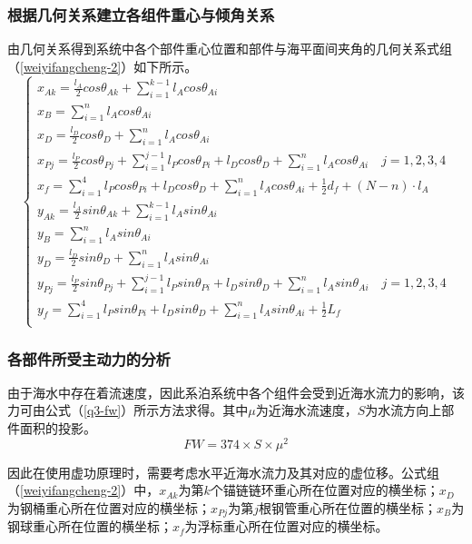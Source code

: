 \documentclass[withoutpreface,bwprint]{cumcmthesis} %
\begin{document}
\subsubsection{根据几何关系建立各组件重心与倾角关系}
\par 由几何关系得到系统中各个部件重心位置和部件与海平面间夹角的几何关系式组（\ref{weiyifangcheng-2}）如下所示。
\begin{equation}
	\label{weiyifangcheng-2}
	\left\{
	\begin{array}{lr}
		x_{Ak} = \frac{l_A}{2} cos \theta_{Ak} + \sum\limits_{i=1}^{k-1} l_A cos \theta_{Ai}\\
		x_B = \sum\limits_{i=1}^{n} l_A cos \theta_{Ai}\\
		x_D = \frac{l_D}{2} cos \theta_D + \sum\limits_{i=1}^{n} l_A cos \theta_{Ai}\\
		x_{Pj} = \frac{l_P}{2} cos \theta_{Pj} + \sum\limits_{i=1}^{j-1} l_P cos \theta_{Pi} + l_D cos \theta_D + \sum\limits_{i=1}^{n} l_A cos \theta_{Ai} \quad j = 1,2,3,4 \\
		x_f = \sum\limits_{i=1}^{4} l_P cos \theta_{Pi} + l_D cos \theta_D + \sum\limits_{i=1}^{n} l_A cos \theta_{Ai} + \frac{1}{2} d_f + (N - n) \cdot l_A\\
		y_{Ak} = \frac{l_A}{2} sin \theta_{Ak} + \sum\limits_{i=1}^{k-1} l_A sin \theta_{Ai}\\
		y_B = \sum\limits_{i=1}^{n} l_A sin \theta_{Ai}\\
		y_D = \frac{l_D}{2} sin \theta_D + \sum\limits_{i=1}^{n} l_A sin \theta_{Ai}\\
		y_{Pj} = \frac{l_P}{2} sin \theta_{Pj} + \sum\limits_{i=1}^{j-1} l_P sin \theta_{Pi} + l_D sin \theta_D + \sum\limits_{i=1}^{n} l_A sin \theta_{Ai} \quad j = 1,2,3,4 \\
		y_f = \sum\limits_{i=1}^{4} l_P sin \theta_{Pi} + l_D sin \theta_D + \sum\limits_{i=1}^{n} l_A sin \theta_{Ai} + \frac{1}{2} L_f\\
	\end{array}
	\right.
\end{equation}

\subsubsection{各部件所受主动力的分析}
\par 由于海水中存在着流速度，因此系泊系统中各个组件会受到近海水流力的影响，该力可由公式（\ref{q3-fw}）所示方法求得。其中$\mu$为近海水流速度，$S$为水流方向上部件面积的投影。
\begin{equation}
	\label{q3-fw}
	FW = 374 \times S \times \mu^2 
\end{equation}
\par 因此在使用虚功原理时，需要考虑水平近海水流力及其对应的虚位移。公式组（\ref{weiyifangcheng-2}）中，$x_{Ak}$为第$k$个锚链链环重心所在位置对应的横坐标；$x_D$为钢桶重心所在位置对应的横坐标；$x_{Pj}$为第$j$根钢管重心所在位置的横坐标；$x_B$为钢球重心所在位置的横坐标；$x_f$为浮标重心所在位置对应的横坐标。
 
\end{document}
